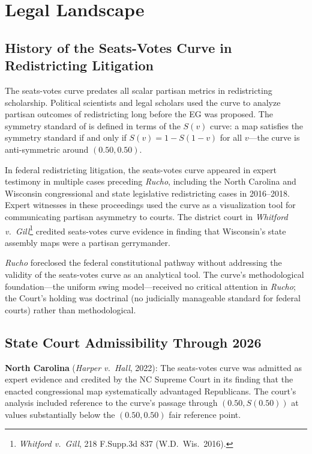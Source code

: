 \section{Legal Landscape}
\label{sec:legal}

\subsection{History of the Seats-Votes Curve in Redistricting Litigation}

The seats-votes curve predates all scalar partisan metrics in redistricting
scholarship. Political scientists and legal scholars used the curve to analyze
partisan outcomes of redistricting long before the EG was proposed. The symmetry
standard of \citet{grofmanKing2007} is defined in terms of the $S(v)$ curve:
a map satisfies the symmetry standard if and only if $S(v) = 1 - S(1-v)$ for
all $v$---the curve is anti-symmetric around $(0.50, 0.50)$.

In federal redistricting litigation, the seats-votes curve appeared in expert
testimony in multiple cases preceding \textit{Rucho}, including the North Carolina
and Wisconsin congressional and state legislative redistricting cases in 2016--2018.
Expert witnesses in these proceedings used the curve as a visualization tool for
communicating partisan asymmetry to courts. The district court in \textit{Whitford v.\
Gill}\footnote{\textit{Whitford v.\ Gill}, 218 F.Supp.3d 837 (W.D.\ Wis.\ 2016).}
credited seats-votes curve evidence in finding that Wisconsin's state assembly maps
were a partisan gerrymander.

\textit{Rucho} foreclosed the federal constitutional pathway without addressing the
validity of the seats-votes curve as an analytical tool. The curve's methodological
foundation---the uniform swing model---received no critical attention in \textit{Rucho};
the Court's holding was doctrinal (no judicially manageable standard for federal
courts) rather than methodological.

\subsection{State Court Admissibility Through 2026}

\textbf{North Carolina} (\textit{Harper v.\ Hall}, 2022): The seats-votes curve
was admitted as expert evidence and credited by the NC Supreme Court in its
finding that the enacted congressional map systematically advantaged Republicans.
The court's analysis included reference to the curve's passage through $(0.50,
S(0.50))$ at values substantially below the $(0.50, 0.50)$ fair reference point.

